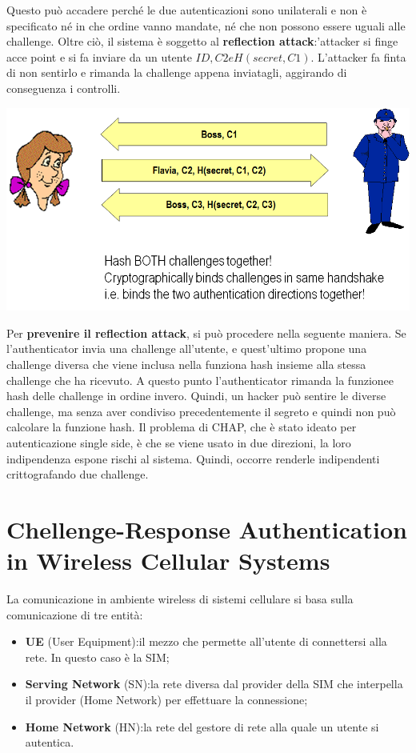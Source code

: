 \documentclass{book}
\theoremstyle{remark}
\begin{document}
Questo può accadere perché le due autenticazioni sono unilaterali e non è specificato né in che ordine vanno mandate, né che non possono essere uguali alle challenge\@. Oltre ciò, il sistema è soggetto al \textbf{reflection attack}:\@l'attacker si finge acce point e si fa inviare da un utente \(ID,C2 e H(secret,C1)\)\@. L'attacker fa finta di non sentirlo e rimanda la challenge appena inviatagli, aggirando di conseguenza i controlli\@.
\begin{center}
	\includegraphics[scale=0.5]{reflectP.png}
\end{center}
Per \textbf{prevenire il reflection attack}, si può procedere nella seguente maniera\@. Se l'authenticator invia una challenge all'utente, e quest'ultimo propone una challenge diversa che viene inclusa nella funziona hash insieme alla stessa challenge che ha ricevuto\@. A questo punto l'authenticator rimanda la funzionee hash delle challenge in ordine invero\@. Quindi, un hacker può sentire le diverse challenge, ma senza aver condiviso precedentemente il segreto e quindi non può calcolare la funzione hash\@.
Il problema di CHAP, che è stato ideato per autenticazione single side, è che se viene usato in due direzioni, la loro indipendenza espone rischi al sistema\@. Quindi, occorre renderle indipendenti crittografando due challenge\@.
\section{Chellenge-Response Authentication in Wireless Cellular Systems}
La comunicazione in ambiente wireless di sistemi cellulare si basa sulla comunicazione di tre entità:\begin{itemize}
	\item \textbf{UE} (User Equipment): il mezzo che permette all'utente di connettersi alla rete\@. In questo caso è la SIM;\@
	\item \textbf{Serving Network} (SN): la rete diversa dal provider della SIM che interpella il provider (Home Network) per effettuare la connessione;\@
	\item \textbf{Home Network} (HN): la rete del gestore di rete alla quale un utente si autentica\@.
\end{itemize}
\end{document}
